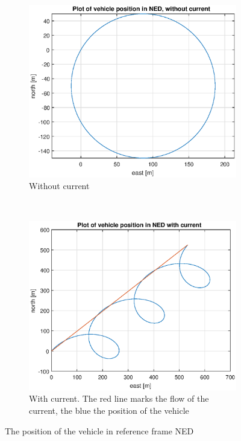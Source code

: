 \begin{figure}[!ht] 
	\centering
	\begin{subfigure}[b]{0.45\textwidth}
		\includegraphics[width=\textwidth]{figures/4_pos.eps}
		\caption{Without current}
	\end{subfigure}
	~ %
	\begin{subfigure}[b]{0.45\textwidth}
		\includegraphics[width=\textwidth]{figures/4_pos_current}
		\caption{With current. The red line marks the flow of the current, the blue the position of the vehicle}
		\label{fig:4_pos_current}
	\end{subfigure}
	\caption{The position of the vehicle in reference frame NED}
	\label{fig:4_pos}
\end{figure}

